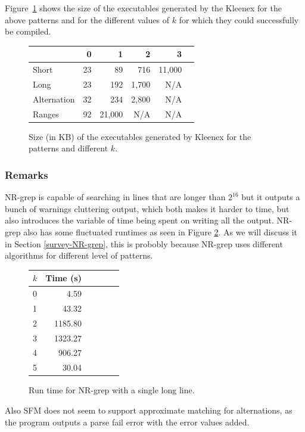 Figure~\ref{fig:exec} shows the size of the executables generated by the
Kleenex for the above patterns and for the different values of $k$ for which
they could successfully be compiled.

\begin{figure}[!hb]
    \centering
    \begin{tabular}{l|rrrrr}
                    & 0     & 1     & 2     & 3\\\hline
        Short       & 23    & 89    & 716   & 11,000\\
        Long        & 23    & 192   & 1,700 & N/A\\
        Alternation & 32    & 234   & 2,800 & N/A\\
        Ranges      & 92    & 21,000& N/A   & N/A\\
    \end{tabular}
    \caption{Size (in KB) of the executables generated by Kleenex for the
      patterns and different $k$.}
    \label{fig:exec}
\end{figure}

\subsubsection{Remarks}
NR-grep is capable of searching in lines that are longer than $2^{16}$ but it
outputs a bunch of warnings cluttering output, which both makes it harder to
time, but also introduces the variable of time being spent on writing all the
output. NR-grep also has some fluctuated runtimes as seen in Figure
\ref{fig:nr-longline}. As we will discuss it in Section \ref{survey-NR-grep},
this is probobly because NR-grep uses different algorithms for different level
of patterns.

\begin{figure}[!ht]
    \centering
    \begin{tabular}{l|rrrrr}
        $k$ & Time (s)\\\hline
        0   & 4.59\\
        1   & 43.32\\
        2   & 1185.80\\
        3   & 1323.27\\
        4   & 906.27\\
        5   & 30.04\\
    \end{tabular}
    \caption{Run time for NR-grep with a single long line.}
    \label{fig:nr-longline}
\end{figure}

Also SFM does not seem to support approximate matching for alternations, as the
program outputs a parse fail error with the error values added.


